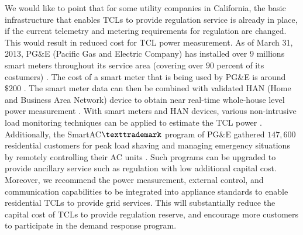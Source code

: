 \documentclass[onecolumn,journal]{IEEEtran}
\begin{document}
We would like to point that for some utility companies in California, the basic infrastructure that enables TCLs to provide regulation service is already in place, if the current telemetry and metering requirements for regulation are changed. This would result in reduced cost for TCL power measurement.  As of March 31, 2013, PG$\&$E (Pacific Gas and Electric Company)  has installed over $9$ millions smart meters throughout its service area (covering over $90$ percent of its costumers)  \cite{smart_meter_pge}. The cost of a smart meter that is being used by PG$\&$E is around $\$200$  \cite{smart_meter, smart_meter_pge}. The smart meter data can then be combined with validated HAN (Home and Business Area Network) device to obtain near real-time whole-house level power measurement  \cite{smart_meter_pge}. With smart meters and HAN devices, various non-intrusive load monitoring techniques can be applied to estimate the TCL power \cite{berges2010enhancing}. Additionally, the SmartAC$\texttrademark$ program of  PG$\&$E gathered $147, 600$ residential customers for peak load shaving and managing emergency situations by remotely controlling their AC units \cite{SmartAC}. Such programs can be upgraded to provide ancillary service such as regulation with low additional capital cost. Moreover, we recommend the power measurement, external control, and communication capabilities to be integrated into appliance standards to enable residential \acp{TCL} to provide grid services. This will substantially reduce the capital cost of \acp{TCL} to provide  regulation reserve, and encourage more customers to participate in the demand response program. 
\end{document}
